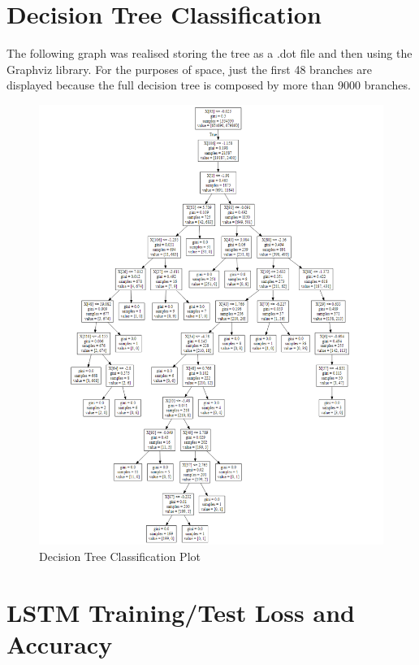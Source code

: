 \begin{appendices}
\clearpage
\section{Decision Tree Classification}

The following graph was realised storing the tree as a .dot file and then using the Graphviz library. For the purposes of space, just the first 48 branches are displayed because the full decision tree is composed by more than 9000 branches. 

\setcounter{figure}{0}
\begin{figure}[ht!]%
    \centering
    \includegraphics[width=14cm]{images/tree}%
    \caption{Decision Tree Classification Plot}%
\end{figure}

\clearpage
\section{LSTM Training/Test Loss and Accuracy}



\end{appendices}
